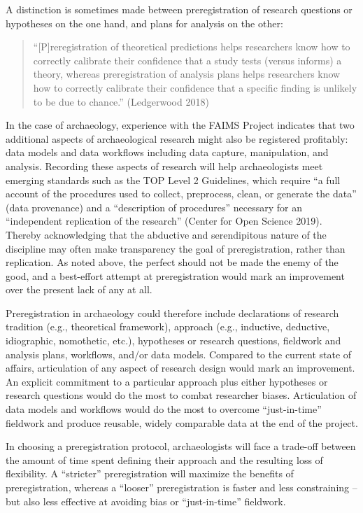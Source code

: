 \documentclass[article]{sa}
\begin{document}
A distinction is sometimes made between preregistration of research
questions or hypotheses on the one hand, and plans for analysis on the
other:

\begin{quote}
    
``{[}P{]}reregistration of theoretical predictions helps researchers know
how to correctly calibrate their confidence that a study tests (versus
informs) a theory, whereas preregistration of analysis plans helps
researchers know how to correctly calibrate their confidence that a
specific finding is unlikely to be due to chance.'' (Ledgerwood 2018)

\end{quote}

In the case of archaeology, experience with the FAIMS Project indicates
that two additional aspects of archaeological research might also be
registered profitably: data models and data workflows including data
capture, manipulation, and analysis. Recording these aspects of research
will help archaeologists meet emerging standards such as the TOP Level 2
Guidelines, which require ``a full account of the procedures used to
collect, preprocess, clean, or generate the data'' (data provenance) and
a ``description of procedures'' necessary for an ``independent replication
of the research'' (Center for Open Science 2019). Thereby acknowledging
that the abductive and serendipitous nature of the discipline may often
make transparency the goal of preregistration, rather than replication.
As noted above, the perfect should not be made the enemy of the good,
and a best-effort attempt at preregistration would mark an improvement
over the present lack of any at all.

Preregistration in archaeology could therefore include declarations of
research tradition (e.g., theoretical framework), approach (e.g.,
inductive, deductive, idiographic, nomothetic, etc.), hypotheses or
research questions, fieldwork and analysis plans, workflows, and/or data
models. Compared to the current state of affairs, articulation of any
aspect of research design would mark an improvement. An explicit
commitment to a particular approach plus either hypotheses or research
questions would do the most to combat researcher biases. Articulation of
data models and workflows would do the most to overcome ``just-in-time''
fieldwork and produce reusable, widely comparable data at the end of the
project.

In choosing a preregistration protocol, archaeologists will face a
trade-off between the amount of time spent defining their approach and
the resulting loss of flexibility. A ``stricter'' preregistration will
maximize the benefits of preregistration, whereas a ``looser''
preregistration is faster and less constraining -- but also less
effective at avoiding bias or ``just-in-time'' fieldwork.
\end{document}
